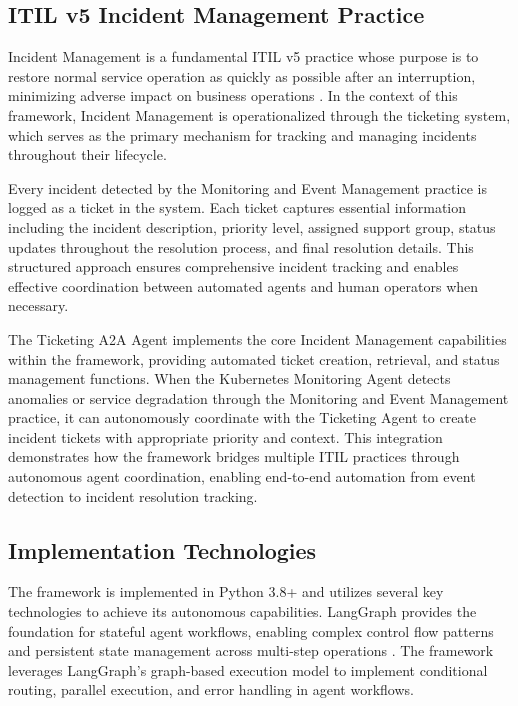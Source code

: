 \documentclass{article}
\begin{document}
\subsection{ITIL v5 Incident Management Practice}

Incident Management is a fundamental ITIL v5 practice whose purpose is to restore normal service operation as quickly as possible after an interruption, minimizing adverse impact on business operations \cite{axelos2019}. In the context of this framework, Incident Management is operationalized through the ticketing system, which serves as the primary mechanism for tracking and managing incidents throughout their lifecycle.

Every incident detected by the Monitoring and Event Management practice is logged as a ticket in the system. Each ticket captures essential information including the incident description, priority level, assigned support group, status updates throughout the resolution process, and final resolution details. This structured approach ensures comprehensive incident tracking and enables effective coordination between automated agents and human operators when necessary.

The Ticketing A2A Agent implements the core Incident Management capabilities within the framework, providing automated ticket creation, retrieval, and status management functions. When the Kubernetes Monitoring Agent detects anomalies or service degradation through the Monitoring and Event Management practice, it can autonomously coordinate with the Ticketing Agent to create incident tickets with appropriate priority and context. This integration demonstrates how the framework bridges multiple ITIL practices through autonomous agent coordination, enabling end-to-end automation from event detection to incident resolution tracking.

\subsection{Implementation Technologies}

The framework is implemented in Python 3.8+ and utilizes several key technologies to achieve its autonomous capabilities. LangGraph provides the foundation for stateful agent workflows, enabling complex control flow patterns and persistent state management across multi-step operations \cite{langchain2024}. The framework leverages LangGraph's graph-based execution model to implement conditional routing, parallel execution, and error handling in agent workflows.
\end{document}

